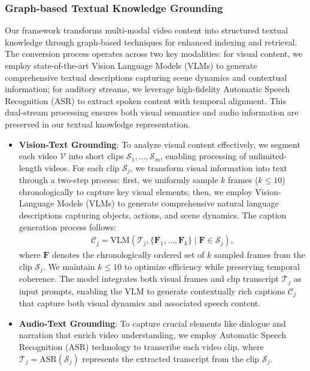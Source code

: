 \subsubsection{\textbf{Graph-based Textual Knowledge Grounding}}
\label{sec:textual indexing}

Our framework transforms multi-modal video content into structured textual knowledge through graph-based techniques for enhanced indexing and retrieval. The conversion process operates across two key modalities: for visual content, we employ state-of-the-art Vision Language Models (VLMs) to generate comprehensive textual descriptions capturing scene dynamics and contextual information; for auditory streams, we leverage high-fidelity Automatic Speech Recognition (ASR) to extract spoken content with temporal alignment. This dual-stream processing ensures both visual semantics and audio information are preserved in our textual knowledge representation.

\begin{itemize}[leftmargin=*]
    \item \textbf{Vision-Text Grounding}: To analyze visual content effectively, we segment each video $\mathcal{V}$ into short clips ${\mathcal{S}_1, \ldots, \mathcal{S}_m}$, enabling processing of unlimited-length videos. For each clip $\mathcal{S}_j$, we transform visual information into text through a two-step process: first, we uniformly sample $k$ frames ($k \leq 10$) chronologically to capture key visual elements; then, we employ Vision-Language Models (VLMs) to generate comprehensive natural language descriptions capturing objects, actions, and scene dynamics. The caption generation process follows:
    \begin{align}
        \mathcal{C}_j = \text{VLM}(\mathcal{T}_j, \{\textbf{F}_1, \ldots, \textbf{F}_k\} \mid \textbf{F} \in \mathcal{S}_j),
    \end{align}
    where ${\textbf{F}}$ denotes the chronologically ordered set of $k$ sampled frames from the clip $\mathcal{S}_j$. We maintain $k \leq 10$ to optimize efficiency while preserving temporal coherence. The model integrates both visual frames and clip transcript $\mathcal{T}_j$ as input prompts, enabling the VLM to generate contextually rich captions $\mathcal{C}_j$ that capture both visual dynamics and associated speech content.
    
    \item \textbf{Audio-Text Grounding}: To capture crucial elements like dialogue and narration that enrich video understanding, we employ Automatic Speech Recognition (ASR) technology to transcribe each video clip, where $\mathcal{T}_j = \text{ASR}(\mathcal{S}_j)$ represents the extracted transcript from the clip $\mathcal{S}_j$.
\end{itemize}


